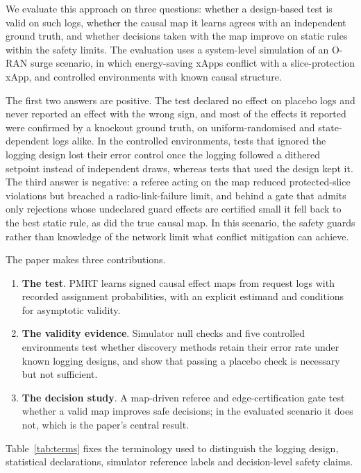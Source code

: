 We evaluate this approach on three questions: whether a design-based test is valid on such logs, whether the causal
map it learns agrees with an independent ground truth, and whether decisions taken with the map improve on static
rules within the safety limits. The evaluation uses a system-level simulation of an O-RAN surge scenario, in which
energy-saving xApps conflict with a slice-protection xApp, and controlled environments with known causal structure.

The first two answers are positive. The test declared no effect on placebo logs and never reported an effect with the
wrong sign, and most of the effects it reported were confirmed by a knockout ground truth, on uniform-randomised and
state-dependent logs alike. In the controlled environments, tests that ignored the logging design lost their error control
once the logging followed a dithered setpoint instead of independent draws, whereas tests that used the design kept
it. The third answer is negative: a referee acting on the map reduced protected-slice violations but breached a
radio-link-failure limit, and behind a gate that admits only rejections whose undeclared guard effects are certified
small it fell back to the best static rule, as did the true causal map. In this scenario, the safety guards rather than knowledge of the network limit what
conflict mitigation can achieve.

The paper makes three contributions.
\begin{enumerate}
\item \textbf{The test}. PMRT learns signed causal effect maps from request logs with recorded assignment
probabilities, with an explicit estimand and conditions for asymptotic validity.
\item \textbf{The validity evidence}. Simulator null checks and five controlled environments test whether discovery
methods retain their error rate under known logging designs, and show that passing a placebo check is necessary but
not sufficient.
\item \textbf{The decision study}. A map-driven referee and edge-certification gate test whether a valid map improves
safe decisions; in the evaluated scenario it does not, which is the paper's central result.
\end{enumerate}

Table~\ref{tab:terms} fixes the terminology used to distinguish the logging design, statistical declarations,
simulator reference labels and decision-level safety claims.

